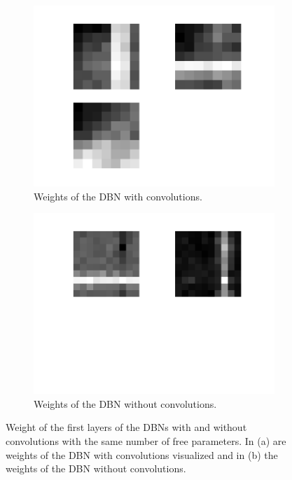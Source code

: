 \begin{figure}[h!]
	\centering
	\begin{subfigure}[t]{.45\textwidth}
  		\centering
  		\includegraphics[width=.9\linewidth]{imgs/cvsnc/wc.png}
  		\caption{Weights of the DBN with convolutions.}
  		\label{fig:sub1}
	\end{subfigure}%
	\begin{subfigure}[t]{.45\textwidth}
  		\centering
  		\includegraphics[width=.9\linewidth]{imgs/cvsnc/wnc.png}
  		\caption{Weights of the DBN without convolutions.}
  		\label{fig:sub2}
	\end{subfigure}
	\caption{Weight of the first layers of the DBNs with and without convolutions with the same number of free parameters. In (a) are weights of the DBN with convolutions visualized and in (b) the weights of the DBN without convolutions.}
	\label{fig:wwoconwconv}
\end{figure}


